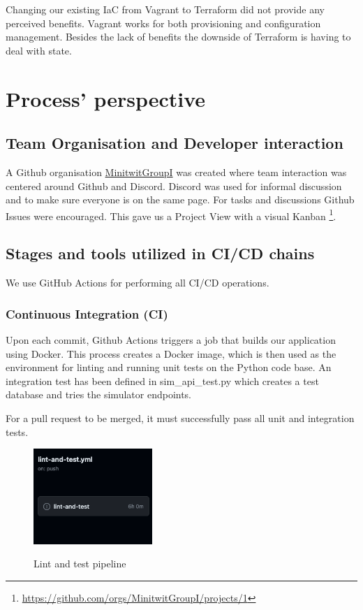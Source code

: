 \documentclass{article}
\begin{document}
Changing our existing IaC from Vagrant to Terraform did not provide any perceived benefits. Vagrant works for both provisioning and configuration management. Besides the lack of benefits the downside of Terraform is having to deal with state. 

\section{Process' perspective} \label{cicd}

\subsection{Team Organisation and Developer interaction} 

A Github organisation \href{https://github.com/MinitwitGroupI/}{MinitwitGroupI} was created where team interaction was centered around Github and Discord. Discord was used for informal discussion and to make sure everyone is on the same page. For tasks and discussions Github Issues were encouraged. This gave us a Project View with a visual Kanban \footnote{\url{https://github.com/orgs/MinitwitGroupI/projects/1}}. 

\subsection{Stages and tools utilized in CI/CD chains}

We use GitHub Actions for performing all CI/CD operations.

\subsubsection{Continuous Integration (CI)}

Upon each commit, Github Actions triggers a job that builds our application using Docker. This process creates a Docker image, which is then used as the environment for linting and running unit tests on the Python code base. An integration test has been defined in sim\_api\_test.py which creates a test database and tries the simulator endpoints.



For a pull request to be merged, it must successfully pass all unit and integration tests.
\begin{figure}[h]
    \includegraphics[width=0.4\textwidth]{images/Lint-and-test_Pipeline.png}
    \label{fig:ci_pipeline}
    \centering
    \caption{Lint and test pipeline}
\end{figure}
    
\end{document}
